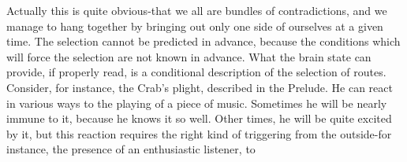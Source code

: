 Actually this is quite obvious-that we all are bundles of contradictions, and we manage to
hang together by bringing out only one side of ourselves at a given time. The selection
cannot be predicted in advance, because the conditions which will force the selection are
not known in advance. What the brain state can provide, if properly read, is a conditional
description of the selection of routes.
         Consider, for instance, the Crab's plight, described in the Prelude. He can react in
various ways to the playing of a piece of music. Sometimes he will be nearly immune to
it, because he knows it so well. Other times, he will be quite excited by it, but this
reaction requires the right kind of triggering from the outside-for instance, the presence of
an enthusiastic listener, to





